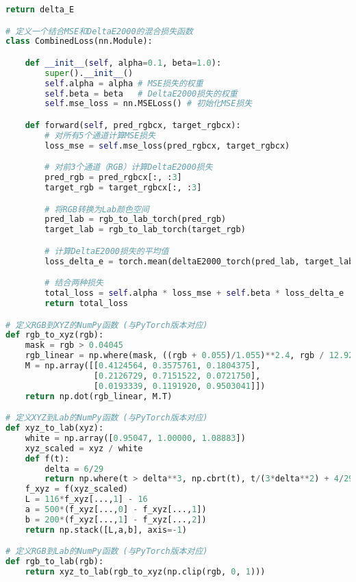 \begin{lstlisting}[language=Python]
    return delta_E

# 定义一个结合MSE和DeltaE2000的混合损失函数
class CombinedLoss(nn.Module):

    def __init__(self, alpha=0.1, beta=1.0):
        super().__init__()
        self.alpha = alpha # MSE损失的权重
        self.beta = beta   # DeltaE2000损失的权重
        self.mse_loss = nn.MSELoss() # 初始化MSE损失

    def forward(self, pred_rgbcx, target_rgbcx):
        # 对所有5个通道计算MSE损失
        loss_mse = self.mse_loss(pred_rgbcx, target_rgbcx)

        # 对前3个通道（RGB）计算DeltaE2000损失
        pred_rgb = pred_rgbcx[:, :3]
        target_rgb = target_rgbcx[:, :3]

        # 将RGB转换为Lab颜色空间
        pred_lab = rgb_to_lab_torch(pred_rgb)
        target_lab = rgb_to_lab_torch(target_rgb)

        # 计算DeltaE2000损失的平均值
        loss_delta_e = torch.mean(deltaE2000_torch(pred_lab, target_lab))

        # 结合两种损失
        total_loss = self.alpha * loss_mse + self.beta * loss_delta_e
        return total_loss

# 定义RGB到XYZ的NumPy函数 (与PyTorch版本对应)
def rgb_to_xyz(rgb):
    mask = rgb > 0.04045
    rgb_linear = np.where(mask, ((rgb + 0.055)/1.055)**2.4, rgb / 12.92)
    M = np.array([[0.4124564, 0.3575761, 0.1804375],
                  [0.2126729, 0.7151522, 0.0721750],
                  [0.0193339, 0.1191920, 0.9503041]])
    return np.dot(rgb_linear, M.T)

# 定义XYZ到Lab的NumPy函数 (与PyTorch版本对应)
def xyz_to_lab(xyz):
    white = np.array([0.95047, 1.00000, 1.08883])
    xyz_scaled = xyz / white
    def f(t):
        delta = 6/29
        return np.where(t > delta**3, np.cbrt(t), t/(3*delta**2) + 4/29)
    f_xyz = f(xyz_scaled)
    L = 116*f_xyz[...,1] - 16
    a = 500*(f_xyz[...,0] - f_xyz[...,1])
    b = 200*(f_xyz[...,1] - f_xyz[...,2])
    return np.stack([L,a,b], axis=-1)

# 定义RGB到Lab的NumPy函数 (与PyTorch版本对应)
def rgb_to_lab(rgb):
    return xyz_to_lab(rgb_to_xyz(np.clip(rgb, 0, 1)))


\end{lstlisting}
